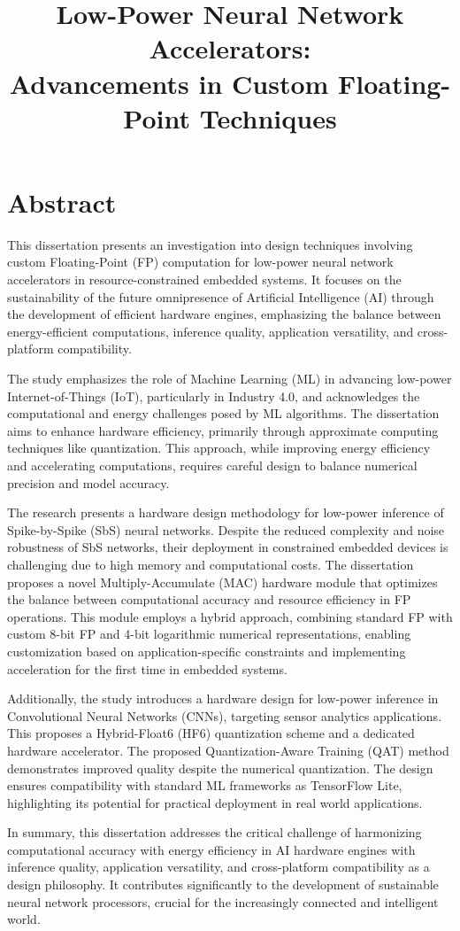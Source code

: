 \documentclass{article}
\title{Low-Power Neural Network Accelerators: \\Advancements in Custom Floating-Point Techniques}
\author{}
\date{}
\begin{document}
	
	\maketitle
	
	\section*{Abstract}
	
	This dissertation presents an investigation into design techniques involving custom Floating-Point (FP) computation for low-power neural network accelerators in resource-constrained embedded systems. It focuses on the sustainability of the future omnipresence of Artificial Intelligence (AI) through the development of efficient hardware engines, emphasizing the balance between energy-efficient computations, inference quality, application versatility, and cross-platform compatibility.
	
	The study emphasizes the role of Machine Learning (ML) in advancing low-power Internet-of-Things (IoT), particularly in Industry 4.0, and acknowledges the computational and energy challenges posed by ML algorithms. The dissertation aims to enhance hardware efficiency, primarily through approximate computing techniques like quantization. This approach, while improving energy efficiency and accelerating computations, requires careful design to balance numerical precision and model accuracy.
	
	The research presents a hardware design methodology for low-power inference of Spike-by-Spike (SbS) neural networks. Despite the reduced complexity and noise robustness of SbS networks, their deployment in constrained embedded devices is challenging due to high memory and computational costs. The dissertation proposes a novel Multiply-Accumulate (MAC) hardware module that optimizes the balance between computational accuracy and resource efficiency in FP operations. This module employs a hybrid approach, combining standard FP with custom 8-bit FP and 4-bit logarithmic numerical representations, enabling customization based on application-specific constraints and implementing acceleration for the first time in embedded systems.
	
	Additionally, the study introduces a hardware design for low-power inference in Convolutional Neural Networks (CNNs), targeting sensor analytics applications. This proposes a Hybrid-Float6 (HF6) quantization scheme and a dedicated hardware accelerator. The proposed Quantization-Aware Training (QAT) method demonstrates improved quality despite the numerical quantization. The design ensures compatibility with standard ML frameworks as TensorFlow Lite, highlighting its potential for practical deployment in real world applications.
	
	In summary, this dissertation addresses the critical challenge of harmonizing computational accuracy with energy efficiency in AI hardware engines with inference quality, application versatility, and cross-platform compatibility as a design philosophy. It contributes significantly to the development of sustainable neural network processors, crucial for the increasingly connected and intelligent world.
\end{document}
